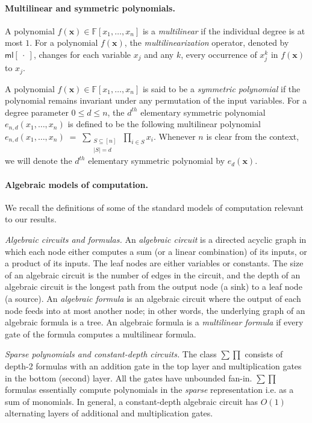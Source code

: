 \documentclass[11pt]{article}
\newcommand{\F}{\mathbb{F}}
\newcommand{\ml}{\mathsf{ml}}
\begin{document}
\paragraph{Multilinear and symmetric polynomials.}
A polynomial $f(\mathbf{x}) \in \F[x_{1},\ldots,x_{n}]$ is a \emph{multilinear} if the individual degree is at most $1$. For a polynomial $f(\mathbf{x})$, the \emph{multilinearization} operator, denoted by $\ml[~\cdot~]$, changes for each variable $x_{j}$ and any $k$, every occurrence of $x_{j}^{k}$ in $f(\mathbf{x})$ to $x_{j}$.

A polynomial $f(\mathbf{x}) \in \F[x_{1},\ldots,x_{n}]$ is said to be a \emph{symmetric polynomial} if the polynomial remains invariant under any permutation of the input variables. For a degree parameter $0 \leq d \leq n$, the $d^{th}$ elementary symmetric polynomial $e_{n,d}(x_{1},\ldots,x_{n})$ is defined to be the following multilinear polynomial $e_{n,d}(x_{1},\ldots,x_{n}) \; = \; \sum_{\substack{S \subseteq [n] \\ |S| = d}} \, \prod_{i \in S} x_{i}$. Whenever $n$ is clear from the context, we will denote the $d^{th}$ elementary symmetric polynomial by $e_{d}(\mathbf{x})$.


\paragraph{Algebraic models of computation.}
We recall the definitions of some of the standard models of computation relevant to our results.

\textit{Algebraic circuits and formulas.} An \emph{algebraic circuit} is a directed acyclic graph in which each node either computes a sum (or a linear combination) of its inputs, or a product of its inputs. The leaf nodes are either variables or constants. The size of an algebraic circuit is the number of edges in the circuit, and the depth of an algebraic circuit is the longest path from the output node (a sink) to a leaf node (a source). An \emph{algebraic formula} is an algebraic circuit where the output of each node feeds into at most another node; in other words, the underlying graph of an algebraic formula is a tree. An algebraic formula is a \emph{multilinear formula} if every gate of the formula computes a multilinear formula.

\textit{Sparse polynomials and constant-depth circuits.} The class $\sum\prod$ consists of depth-2 formulas with an addition gate in the top layer and multiplication gates in the bottom (second) layer. All the gates have unbounded fan-in. $\sum\prod$ formulas essentially compute polynomials in the \emph{sparse} representation i.e. as a sum of monomials. In general, a constant-depth algebraic circuit has $O(1)$ alternating layers of additional and multiplication gates. 
\end{document}
